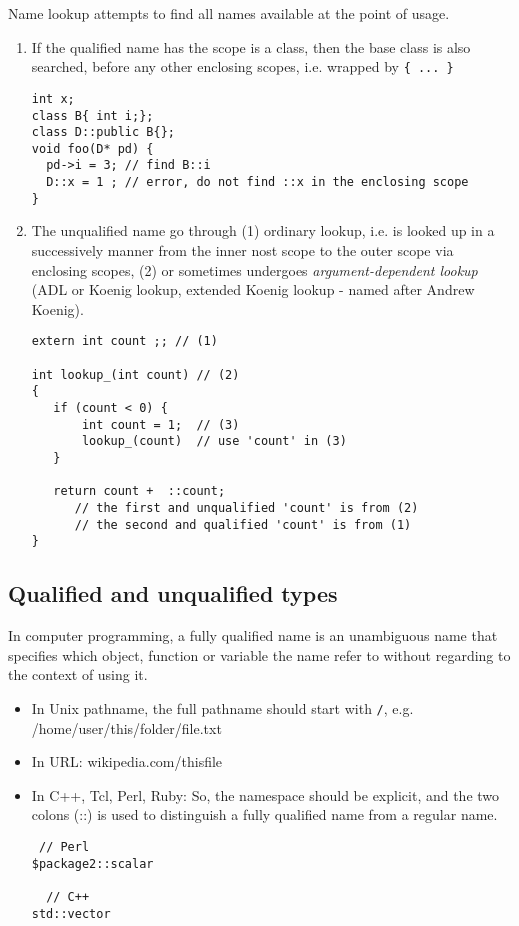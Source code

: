 Name lookup attempts to find all names available at the point of usage. 
\begin{enumerate}
  \item  If the
qualified name has the scope is a class, then the base class is also searched,
before any other enclosing scopes, i.e. wrapped by \verb!{ ... }!
\begin{verbatim}
int x;
class B{ int i;};
class D::public B{};
void foo(D* pd) {
  pd->i = 3; // find B::i
  D::x = 1 ; // error, do not find ::x in the enclosing scope
}
\end{verbatim}
  
   \item The unqualified name go through (1) ordinary lookup, i.e. is looked up
   in a successively manner from the inner nost scope to the outer scope via
   enclosing scopes, (2) or sometimes undergoes {\it argument-dependent lookup}
   (ADL or Koenig lookup, extended Koenig lookup - named after Andrew Koenig).
   
\begin{verbatim}
extern int count ;; // (1)

int lookup_(int count) // (2)
{
   if (count < 0) {
       int count = 1;  // (3)
       lookup_(count)  // use 'count' in (3)
   }
   
   return count +  ::count; 
      // the first and unqualified 'count' is from (2)
      // the second and qualified 'count' is from (1)
}
\end{verbatim}
\end{enumerate}

\subsection{Qualified and unqualified types}

In computer programming, a fully qualified name is an unambiguous name that
specifies which object, function or variable the name refer to without regarding
to the context of using it. 
\begin{itemize}
  \item In Unix pathname, the full pathname should start with \verb!/!, e.g.
  /home/user/this/folder/file.txt
  
  \item In URL: wikipedia.com/thisfile
  \item In C++, Tcl, Perl, Ruby: So, the namespace should be explicit, and the two
colons (::) is used to distinguish a fully qualified name from a regular name.

\begin{verbatim}
 // Perl
$package2::scalar
 
  // C++
std::vector  
\end{verbatim}
  
\end{itemize}




